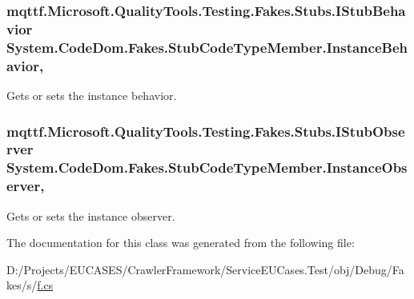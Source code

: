 \hypertarget{class_system_1_1_code_dom_1_1_fakes_1_1_stub_code_type_member_ace01653f0898203c907d35e0021ce587}{
\subsubsection[{Instance\-Behavior}]{\setlength{\rightskip}{0pt plus 5cm}mqttf.\-Microsoft.\-Quality\-Tools.\-Testing.\-Fakes.\-Stubs.\-I\-Stub\-Behavior System.\-Code\-Dom.\-Fakes.\-Stub\-Code\-Type\-Member.\-Instance\-Behavior\hspace{0.3cm}{\ttfamily [get]}, {\ttfamily [set]}}}\label{class_system_1_1_code_dom_1_1_fakes_1_1_stub_code_type_member_ace01653f0898203c907d35e0021ce587}


Gets or sets the instance behavior.

\hypertarget{class_system_1_1_code_dom_1_1_fakes_1_1_stub_code_type_member_a10c02c633674a6d8b1b86dfd82e434fe}{
\subsubsection[{Instance\-Observer}]{\setlength{\rightskip}{0pt plus 5cm}mqttf.\-Microsoft.\-Quality\-Tools.\-Testing.\-Fakes.\-Stubs.\-I\-Stub\-Observer System.\-Code\-Dom.\-Fakes.\-Stub\-Code\-Type\-Member.\-Instance\-Observer\hspace{0.3cm}{\ttfamily [get]}, {\ttfamily [set]}}}\label{class_system_1_1_code_dom_1_1_fakes_1_1_stub_code_type_member_a10c02c633674a6d8b1b86dfd82e434fe}


Gets or sets the instance observer.



The documentation for this class was generated from the following file\-:\begin{DoxyCompactItemize}
\item 
D\-:/\-Projects/\-E\-U\-C\-A\-S\-E\-S/\-Crawler\-Framework/\-Service\-E\-U\-Cases.\-Test/obj/\-Debug/\-Fakes/s/\hyperlink{s_2f_8cs}{f.\-cs}\end{DoxyCompactItemize}
